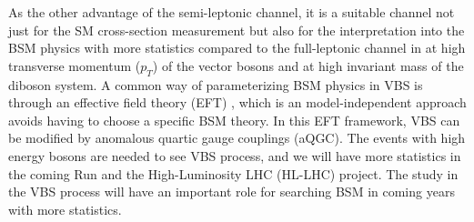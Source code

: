 As the other advantage of the semi-leptonic channel, it is a suitable channel not just for the SM cross-section measurement but also for the interpretation into the BSM physics with more statistics compared to the full-leptonic channel in at high transverse momentum ($p_T$) of the vector bosons and at high invariant mass of the diboson system.
A common way of parameterizing BSM physics in VBS is through an effective field theory (EFT) \cite{Longhitano:1980tm}, which is an model-independent approach avoids having to choose a specific BSM theory. In this EFT framework, VBS can be modified by anomalous quartic gauge couplings (aQGC). 
The events with high energy bosons are needed to see VBS process, and we will have more statistics in the coming Run and the High-Luminosity LHC (HL-LHC) project. The study in the VBS process will have an important role for searching BSM in coming years with more statistics.
